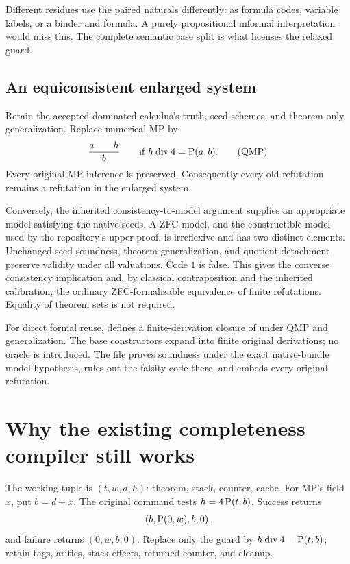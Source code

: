 \documentclass[11pt]{article}
\newcommand{\code}[1]{\texttt{\detokenize{#1}}}
\begin{document}
Different residues use the paired naturals differently: as formula codes, variable labels, or a binder and formula. A purely propositional informal interpretation would miss this. The complete semantic case split is what licenses the relaxed guard.

\subsection{An equiconsistent enlarged system}

Retain the accepted dominated calculus's truth, seed schemes, and theorem-only generalization. Replace numerical MP by
\[
 \frac{a\qquad h}{b}\qquad
 \text{if }h\mathbin{\mathrm{div}}4=\operatorname{P}(a,b).
 \tag{QMP}
\]
Every original MP inference is preserved. Consequently every old refutation remains a refutation in the enlarged system.

Conversely, the inherited consistency-to-model argument supplies an appropriate model satisfying the native seeds. A ZFC model, and the constructible model used by the repository's upper proof, is irreflexive and has two distinct elements. Unchanged seed soundness, theorem generalization, and quotient detachment preserve validity under all valuations. Code $1$ is false. This gives the converse consistency implication and, by classical contraposition and the inherited calibration, the ordinary ZFC-formalizable equivalence of finite refutations. Equality of theorem sets is not required.

For direct formal reuse, \code{Quotient222.lean} defines a finite-derivation closure of \code{C222} under QMP and generalization. The base constructors expand into finite original derivations; no oracle is introduced. The file proves soundness under the exact native-bundle model hypothesis, rules out the falsity code there, and embeds every original refutation.

\CalibrationDiscussion

\section{Why the existing completeness compiler still works}

The working tuple is $(t,w,d,h)$: theorem, stack, counter, cache. For MP's field $x$, put $b=d+x$. The original command tests $h=4\operatorname{P}(t,b)$. Success returns
\[
 (b,\operatorname{P}(0,w),b,0),
\]
and failure returns $(0,w,b,0)$. Replace only the guard by $h\mathbin{\mathrm{div}}4=\operatorname{P}(t,b)$; retain tags, arities, stack effects, returned counter, and cleanup.
\end{document}

